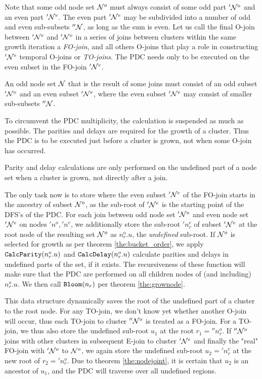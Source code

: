 Note that some odd node set $\mathcal{N}^o$ must always consist of some odd part $'\mathcal{N}^o$ and an even part $'\mathcal{N}^e$. The even part $'\mathcal{N}^e$ may be subdivided into a number of odd and even sub-subsets $''\mathcal{N}$, as long as the sum is even. Let us call the final O-join between $'\mathcal{N}^e$ and $'\mathcal{N}^o$ in a series of joins between clusters within the same growth iteration a \emph{FO-join}, and all others O-joins that play a role in constructing $'\mathcal{N}^e$ temporal O-joins or \emph{TO-joins}. The PDC needs only to be executed on the even subset in the FO-join $'\mathcal{N}^e$.
\begin{lemma}\label{lem:oddisevenodd}
  An odd node set $\mathcal{N}$ that is the result of some joins must consist of an odd subset $'\mathcal{N}^o$ and an even subset $'\mathcal{N}^e$, where the even subset $'\mathcal{N}^e$ may consist of smaller sub-subsets $''\mathcal{N}$.
\end{lemma}
To circumvent the PDC multiplicity, the calculation is suspended as much as possible. The parities and delays are required for the growth of a cluster. Thus the PDC is to be executed just before a cluster is grown, not when some O-join has occurred.
\begin{lemma}\label{lem:delaywhengrown}
  Parity and delay calculations are only performed on the undefined part of a node set when a cluster is grown, not directly after a join.
\end{lemma}

The only task now is to store where the even subset $'\mathcal{N}^e$ of the FO-join starts in the ancestry of subset $\mathcal{N}^o$, as the sub-root of $'\mathcal{N}^e$ is the starting point of the DFS's of the PDC. For each join between odd node set $'\mathcal{N}^o$ and even node set $'\mathcal{N}^e$ on nodes $'n^o, 'n^e$, we additionally store the sub-root $'n^e_r$ of subset $'\mathcal{N}^e$ at the root node of the resulting set $\mathcal{N}^{o}$ as $n^{o}_r.u$, the \emph{undefined} sub-root. If $\mathcal{N}^{o}$ is selected for growth as per theorem \ref{the:bucket_order}, we apply $\texttt{CalcParity}(n^{o}_r.u)$ and $\texttt{CalcDelay}(n^{o}_r.u)$ calculate parities and delays in undefined parts of the set, if it exists. The recursiveness of these function will make sure that the PDC are performed on all children nodes of (and including) $n^{o}_r.u$. We then call $\texttt{Bloom}(n_r)$ per theorem \ref{the:grownode}.

This data structure dynamically saves the root of the undefined part of a cluster to the root node. For any TO-join, we don't know yet whether another O-join will occur, thus each TO-join to cluster $''\mathcal{N}^o$ is treated as a FO-join. For a TO-join, we thus also store the undefined sub-root $u_1$ at the root $r_1=''n_r^o$. If $''\mathcal{N}^o$ joins with other clusters in subsequent E-join to cluster $'\mathcal{N}^e$ and finally the "real" FO-join with $'\mathcal{N}^o$ to $\mathcal{N}^o$, we again store the undefined sub-root $u_2='n_r^e$ at the new root of $r_2='n_r^o$. Due to theorem \ref{the:nodejoint}, it is certain that $u_2$ is an ancestor of $u_1$, and the PDC will traverse over all undefined regions.

